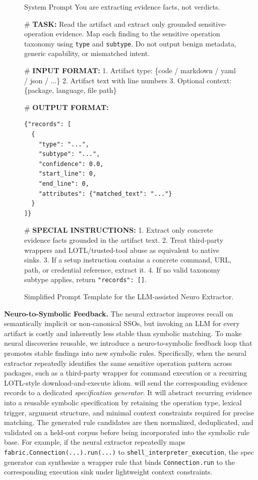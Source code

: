 \begin{figure}[t]
    \centering
    {
    \sffamily\fontsize{7pt}{8.4pt}\selectfont

    \begin{snapshotbox}{System Prompt}
You are extracting evidence facts, not verdicts.

\# \textbf{TASK:}
Read the artifact and extract only grounded sensitive-operation evidence.
Map each finding to the sensitive operation taxonomy using \texttt{type} and \texttt{subtype}.
Do not output benign metadata, generic capability, or mismatched intent.

\# \textbf{INPUT FORMAT:}
1. Artifact type: \{code / markdown / yaml / json / ...\}
2. Artifact text with line numbers
3. Optional context: \{package, language, file path\}

\# \textbf{OUTPUT FORMAT:}
\begin{verbatim}
{"records": [
  {
    "type": "...",
    "subtype": "...",
    "confidence": 0.0,
    "start_line": 0,
    "end_line": 0,
    "attributes": {"matched_text": "..."}
  }
]}
\end{verbatim}

\# \textbf{SPECIAL INSTRUCTIONS:}
1. Extract only concrete evidence facts grounded in the artifact text.
2. Treat third-party wrappers and LOTL/trusted-tool abuse as equivalent to native sinks.
3. If a setup instruction contains a concrete command, URL, path, or credential reference, extract it.
4. If no valid taxonomy subtype applies, return \texttt{"records": []}.
    \end{snapshotbox}
    }
    \caption{Simplified Prompt Template for the LLM-assisted Neuro Extractor.}
    \label{fig:neuro-prompt}
\end{figure}

\noindent \textbf{Neuro-to-Symbolic Feedback.} The neural extractor improves recall on semantically implicit or non-canonical SSOs, but invoking an LLM for every artifact is costly and inherently less stable than symbolic matching. To make neural discoveries reusable, we introduce a neuro-to-symbolic feedback loop that promotes stable findings into new symbolic rules. Specifically, when the neural extractor repeatedly identifies the same sensitive operation pattern across packages, such as a third-party wrapper for command execution or a recurring LOTL-style download-and-execute idiom. \toolname will send the corresponding evidence records to a dedicated \emph{specification generator}. It will abstract recurring evidence into a reusable symbolic specification by retaining the operation type, lexical trigger, argument structure, and minimal context constraints required for precise matching. The generated rule candidates are then normalized, deduplicated, and validated on a held-out corpus before being incorporated into the symbolic rule base. For example, if the neural extractor repeatedly maps \texttt{fabric.Connection(...).run(...)} to \texttt{shell\_interpreter\_execution}, the spec generator can synthesize a wrapper rule that binds \texttt{Connection.run} to the corresponding execution sink under lightweight context constraints.

